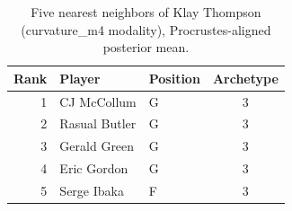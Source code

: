\begin{table}[htbp]
  \centering\small
  \begin{tabular}{rllc}
    \toprule
    Rank & Player & Position & Archetype \\
    \midrule
    1 & CJ McCollum & G & 3 \\
    2 & Rasual Butler & G & 3 \\
    3 & Gerald Green & G & 3 \\
    4 & Eric Gordon & G & 3 \\
    5 & Serge Ibaka & F & 3 \\
    \bottomrule
  \end{tabular}
  \caption{Five nearest neighbors of Klay Thompson (curvature_m4 modality), Procrustes-aligned posterior mean.}
  \label{tab:Klay_Thompson_neighbors_curvature_m4}
\end{table}

